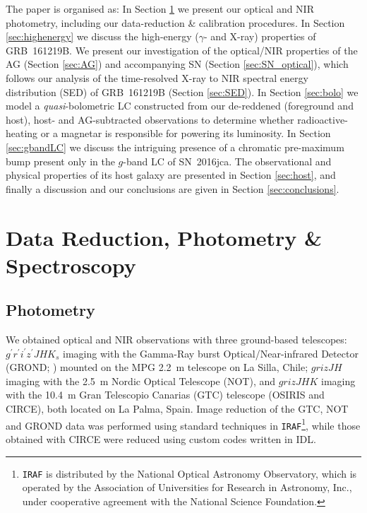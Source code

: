 \documentclass[traditabstract,longauth]{aa}
\begin{document}
The paper is organised as: In Section \ref{sec:datared} we present our optical and NIR photometry, including our data-reduction \& calibration procedures.  In Section \ref{sec:highenergy} we discuss the high-energy ($\gamma$- and X-ray) properties of GRB~161219B.  We present our investigation of the optical/NIR properties of the AG (Section \ref{sec:AG}) and accompanying SN (Section \ref{sec:SN_optical}), which follows our analysis of the time-resolved X-ray to NIR spectral energy distribution (SED) of GRB~161219B (Section \ref{sec:SED}).  In Section \ref{sec:bolo} we model a \emph{quasi}-bolometric LC constructed from our de-reddened (foreground and host), host- and AG-subtracted observations to determine whether radioactive-heating or a magnetar is responsible for powering its luminosity.  In Section \ref{sec:gbandLC} we discuss the intriguing presence of a chromatic pre-maximum bump present only in the $g$-band LC of SN~2016jca.  The observational and physical properties of its host galaxy are presented in Section \ref{sec:host}, and finally a discussion and our conclusions are given in Section \ref{sec:conclusions}.









\section{Data Reduction, Photometry \& Spectroscopy}
\label{sec:datared}

\subsection{Photometry}

We obtained optical and NIR observations with three ground-based telescopes: $g^{\prime}r^{\prime}i^{\prime}z^{\prime}JHK_s$ imaging with the Gamma-Ray burst Optical/Near-infrared Detector (GROND; \citealt{Greiner08}) mounted on the MPG 2.2~m telescope on La Silla, Chile; $grizJH$ imaging with the 2.5~m Nordic Optical Telescope (NOT), and $grizJHK$ imaging with the 10.4~m Gran Telescopio Canarias (GTC) telescope (OSIRIS and CIRCE), both located on La Palma, Spain.  Image reduction of the GTC, NOT and GROND \citep{Kruehler08} data was performed using standard techniques in \texttt{IRAF}\footnote{\texttt{IRAF} is distributed by the National Optical Astronomy Observatory, which is operated by the Association of Universities for Research in Astronomy, Inc., under cooperative agreement with the National Science Foundation.}, while those obtained with CIRCE \citep{Garner14} were reduced using custom codes written in IDL.   
\end{document}
